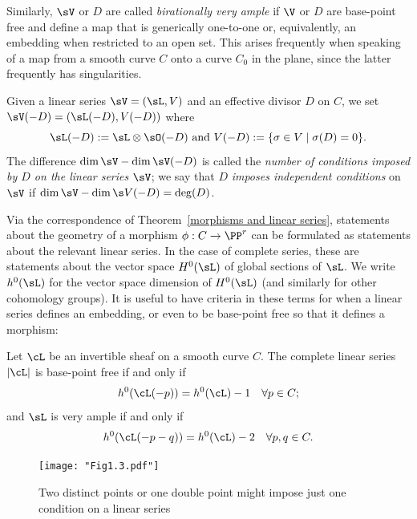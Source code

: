 Similarly, $\sV$ or $D$ are called \emph{birationally very ample}
if $\V$ or $D$ are base-point free and define a map that is generically one-to-one or, equivalently,
an embedding when restricted to an open set. This arises frequently when speaking of a map from a smooth
curve $C$ onto a curve $C_{0}$ in the plane, since the latter frequently has singularities.

Given a linear series $\sV = (\sL, V)$ and an effective divisor $D$ on $C$, we  set
$
\sV(-D) = (\sL(-D),V(-D))
$
where
$$
\sL(-D): = \sL \otimes \sO(-D)\hbox{ and } V(-D) := \{ \sigma \in V \mid \sigma(D) = 0 \}.
$$
The difference $\dim \sV - \dim \sV(-D)$ is called the \emph{number of conditions imposed by $D$ on the linear series $\sV$}; we say that $D$ \emph{imposes independent conditions} on $\sV$ if $\dim \sV - \dim \s V(-D) = \deg(D)$.

Via the correspondence of Theorem~\ref{morphisms and linear series}, statements about the geometry of a morphism $\phi : C \to \PP^r$ can be formulated as statements about the relevant linear series. In the case of complete series, these are statements about the vector space $H^{0}(\sL)$ of global sections of $\sL$. We write $h^{0}(\sL)$ for the vector space dimension of $H^0(\sL)$ (and similarly for other cohomology groups). It is useful to have criteria
in these terms for when a linear series defines an embedding, or even to be base-point free so that it
defines a morphism:

\begin{proposition}\label{very ample}\cite[Thm. IV.3.1]{Hartshorne1977}
Let $\cL$ be an invertible sheaf on a smooth curve $C$. The complete linear series $|\cL|$ is base-point free if and only if
$$
h^0(\cL(-p)) = h^0(\cL) - 1 \quad \forall p \in C;
$$
and $\sL$ is very ample if and only if
$$
h^0(\cL(-p-q)) = h^0(\cL) - 2 \quad \forall p, q \in C.
$$
\end{proposition} 

\begin{figure}
 \caption{Two distinct points or one double point might impose just one condition on a linear series}
\centerline {\texttt{[image: "Fig1.3.pdf"]}}
\end{figure}

